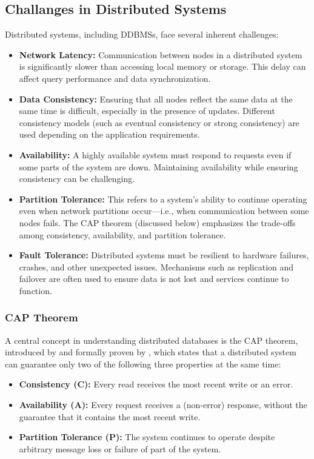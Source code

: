 \subsection{Challanges in Distributed Systems}
Distributed systems, including DDBMSs, face several inherent challenges:
\begin{itemize}
	\item \textbf{Network Latency:} Communication between nodes in a distributed system is significantly slower than accessing local memory or storage.
		This delay can affect query performance and data synchronization.

	\item \textbf{Data Consistency:} Ensuring that all nodes reflect the same data at the same time is difficult, especially in the presence of updates.
		Different consistency models (such as eventual consistency or strong consistency) are used depending on the application requirements.

	\item \textbf{Availability:} A highly available system must respond to requests even if some parts of the system are down.
		Maintaining availability while ensuring consistency can be challenging.

	\item \textbf{Partition Tolerance:} This refers to a system's ability to continue operating even when network partitions occur—i.e., when communication between some nodes fails.
		The CAP theorem (discussed below) emphasizes the trade-offs among consistency, availability, and partition tolerance.

	\item \textbf{Fault Tolerance:} Distributed systems must be resilient to hardware failures, crashes, and other unexpected issues.
		Mechanisms such as replication and failover are often used to ensure data is not lost and services continue to function.
\end{itemize}

\subsubsection{CAP Theorem}
A central concept in understanding distributed databases is the CAP theorem, introduced by \cite{brewerRobustDistributedSystems2000} and formally proven by \cite{gilbertBrewersConjectureFeasibility2002}, which states that a distributed system can guarantee only two of the following three properties at the same time:

\begin{itemize}
	\item \textbf{Consistency (C):} Every read receives the most recent write or an error.
	\item \textbf{Availability (A):} Every request receives a (non-error) response, without the guarantee that it contains the most recent write.
	\item \textbf{Partition Tolerance (P):} The system continues to operate despite arbitrary message loss or failure of part of the system.
\end{itemize}

